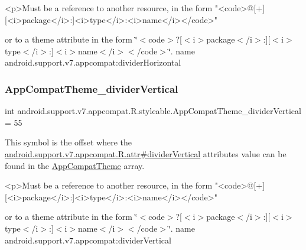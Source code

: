 \begin{DoxyVerb}      <p>Must be a reference to another resource, in the form "<code>@[+][<i>package</i>:]<i>type</i>:<i>name</i></code>"
\end{DoxyVerb}
 or to a theme attribute in the form \char`\"{}$<$code$>$?\mbox{[}$<$i$>$package$<$/i$>$\+:\mbox{]}\mbox{[}$<$i$>$type$<$/i$>$\+:\mbox{]}$<$i$>$name$<$/i$>$$<$/code$>$\char`\"{}.  name android.\+support.\+v7.\+appcompat\+:divider\+Horizontal \mbox{\label{classandroid_1_1support_1_1v7_1_1appcompat_1_1R_1_1styleable_a0229bd53423fdcafebbee737780714c3}} 
\subsubsection{\texorpdfstring{App\+Compat\+Theme\+\_\+divider\+Vertical}{AppCompatTheme\_dividerVertical}}
{\footnotesize\ttfamily int android.\+support.\+v7.\+appcompat.\+R.\+styleable.\+App\+Compat\+Theme\+\_\+divider\+Vertical = 55\hspace{0.3cm}{\ttfamily [static]}}

This symbol is the offset where the \hyperlink{classandroid_1_1support_1_1v7_1_1appcompat_1_1R_1_1attr_aa203492b19a06c186b417263d520f4e2}{android.\+support.\+v7.\+appcompat.\+R.\+attr\#divider\+Vertical} attribute\textquotesingle{}s value can be found in the \hyperlink{classandroid_1_1support_1_1v7_1_1appcompat_1_1R_1_1styleable_a5c42f89e8a410c323be34208d75c430b}{App\+Compat\+Theme} array.

\begin{DoxyVerb}      <p>Must be a reference to another resource, in the form "<code>@[+][<i>package</i>:]<i>type</i>:<i>name</i></code>"
\end{DoxyVerb}
 or to a theme attribute in the form \char`\"{}$<$code$>$?\mbox{[}$<$i$>$package$<$/i$>$\+:\mbox{]}\mbox{[}$<$i$>$type$<$/i$>$\+:\mbox{]}$<$i$>$name$<$/i$>$$<$/code$>$\char`\"{}.  name android.\+support.\+v7.\+appcompat\+:divider\+Vertical \mbox{\label{classandroid_1_1support_1_1v7_1_1appcompat_1_1R_1_1styleable_a64633ebcc361abc4bc0d98ec47d2ec0e}} 
